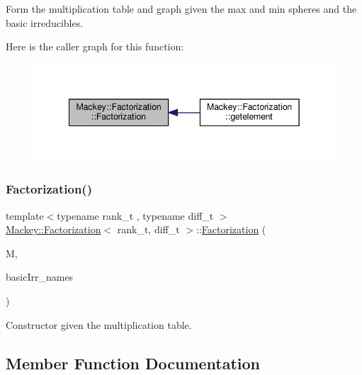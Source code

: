 Form the multiplication table and graph given the max and min spheres and the basic irreducibles. 

Here is the caller graph for this function\+:\nopagebreak
\begin{figure}[H]
\begin{center}
\leavevmode
\includegraphics[width=342pt]{classMackey_1_1Factorization_af1b07ab5021c4e51698c4cd3fbb85422_icgraph}
\end{center}
\end{figure}
\mbox{\label{classMackey_1_1Factorization_a4d55bc1d6f94bdbcd365ed1bb0eaa2cb}} 
\subsubsection{\texorpdfstring{Factorization()}{Factorization()}\hspace{0.1cm}{\footnotesize\ttfamily [2/2]}}
{\footnotesize\ttfamily template$<$typename rank\+\_\+t , typename diff\+\_\+t $>$ \\
\hyperlink{classMackey_1_1Factorization}{Mackey\+::\+Factorization}$<$ rank\+\_\+t, diff\+\_\+t $>$\+::\hyperlink{classMackey_1_1Factorization}{Factorization} (\begin{DoxyParamCaption}\item[{\hyperlink{classMackey_1_1MultiplicationTable}{Multiplication\+Table}$<$ rank\+\_\+t, diff\+\_\+t $>$ \&}]{M,  }\item[{const std\+::vector$<$ std\+::string $>$ \&}]{basic\+Irr\+\_\+names }\end{DoxyParamCaption})\hspace{0.3cm}{\ttfamily [inline]}}



Constructor given the multiplication table. 



\subsection{Member Function Documentation}
\mbox{\label{classMackey_1_1Factorization_a2e135a37687fc3d69cd16a8729dd19eb}} 
